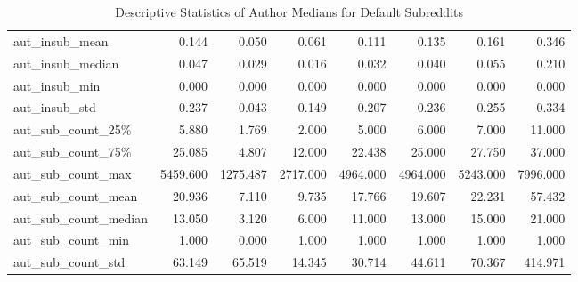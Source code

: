 \begin{table}
\begin{tabular}{lrrrrrrr}
aut\_insub\_mean         &       0.144 &      0.050 &    0.061 &       0.111 &       0.135 &       0.161 &       0.346 \\
aut\_insub\_median       &       0.047 &      0.029 &    0.016 &       0.032 &       0.040 &       0.055 &       0.210 \\
aut\_insub\_min          &       0.000 &      0.000 &    0.000 &       0.000 &       0.000 &       0.000 &       0.000 \\
aut\_insub\_std          &       0.237 &      0.043 &    0.149 &       0.207 &       0.236 &       0.255 &       0.334 \\
aut\_sub\_count\_25\%      &       5.880 &      1.769 &    2.000 &       5.000 &       6.000 &       7.000 &      11.000 \\
aut\_sub\_count\_75\%      &      25.085 &      4.807 &   12.000 &      22.438 &      25.000 &      27.750 &      37.000 \\
aut\_sub\_count\_max      &    5459.600 &   1275.487 & 2717.000 &    4964.000 &    4964.000 &    5243.000 &    7996.000 \\
aut\_sub\_count\_mean     &      20.936 &      7.110 &    9.735 &      17.766 &      19.607 &      22.231 &      57.432 \\
aut\_sub\_count\_median   &      13.050 &      3.120 &    6.000 &      11.000 &      13.000 &      15.000 &      21.000 \\
aut\_sub\_count\_min      &       1.000 &      0.000 &    1.000 &       1.000 &       1.000 &       1.000 &       1.000 \\
aut\_sub\_count\_std      &      63.149 &     65.519 &   14.345 &      30.714 &      44.611 &      70.367 &     414.971 \\
\bottomrule
\end{tabular}
\caption{Descriptive Statistics of Author Medians for Default Subreddits}
\label{table/author-medians:defaults}
\end{table}